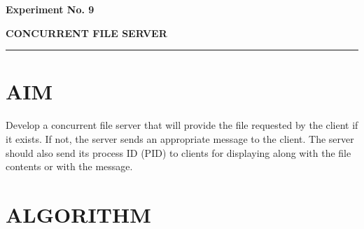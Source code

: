 \documentclass[12pt,a4paper]{article}
\newcommand{\experiment}[2]{
	\newpage
	
	\begin{center}
		\noindent
		\begin{minipage}{\textwidth}
			\centering
			{\textbf{\Large Experiment No. #1}}
			
			\vspace{1cm}
			
			\textbf{\Large #2}
		\end{minipage}
		
		\vspace{0.3cm}
		\noindent\rule{\textwidth}{0.6pt}
	\end{center}
}
\begin{document}
	
	
	\experiment{9}{CONCURRENT FILE SERVER}
	
	\section*{AIM}
	
	Develop a concurrent file server that will provide the file requested by the client if it
	exists. If not, the server sends an appropriate message to the client. The server should also
	send its process ID (PID) to clients for displaying along with the file contents or with the
	message.
	
	\section*{ALGORITHM}
\end{document}
